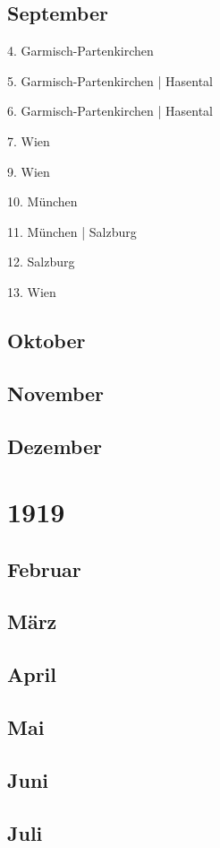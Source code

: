 \documentclass[twoside=false,titlepage=false,open=any, parskip=never, fontsize=10pt, headings=small, chapterprefix=false, appendixprefix=false, DIV=15]{scrbook}
\begin{document}
\begin{multicols}{3}
            \section*{September}
            4. Garmisch-Partenkirchen\par
            5. Garmisch-Partenkirchen | Hasental\par
            6. Garmisch-Partenkirchen | Hasental\par
            7. Wien\par
            9. Wien\par
            10. München\par
            11. München | Salzburg\par
            12. Salzburg\par
            13. Wien\par
            \section*{Oktober}
            \section*{November}
            \section*{Dezember}
            \chapter*{1919}
            \section*{Februar}
            \section*{März}
            \section*{April}
            \section*{Mai}
            \section*{Juni}
            \section*{Juli}

\end{multicols}
\end{document}
